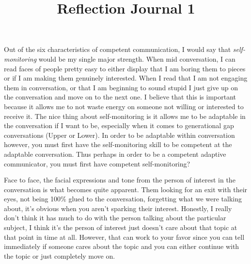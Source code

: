 \documentclass[12pt]{article}
\begin{document}
\title{Reflection Journal 1}




\par
Out of the six characteristics of competent communication, I would say that \emph{self-monitoring} would be my single major strength. When mid conversation, I can read faces of people pretty easy to either display that I am boring them to pieces or if I am making them genuinely interested. When I read that I am not engaging them in conversation, or that I am beginning to sound stupid I just give up on the conversation and move on to the next one. I believe that this is important because it allows me to not waste energy on someone not willing or interested to receive it. The nice thing about self-monitoring is it allows me to be adaptable in the conversation if I want to be, especially when it comes to generational gap conversations (Upper or Lower). In order to be adaptable within conversation however, you must first have the self-monitoring skill to be competent at the adaptable conversation. Thus perhaps in order to be a competent adaptive communicator, you must first have competent self-monitoring?
\par 
Face to face, the facial expressions and tone from the person of interest in the conversation is what becomes quite apparent. Them looking for an exit with their eyes, not being 100\% glued to the conversation, forgetting what we were talking about, it's obvious when you aren't sparking their interest. Honestly, I really don't think it has much to do with the person talking about the particular subject, I think it's the person of interest just doesn't care about that topic at that point in time at all. However, that can work to your favor since you can tell immediately if someone cares about the topic and you can either continue with the topic or just completely move on.
\end{document}
